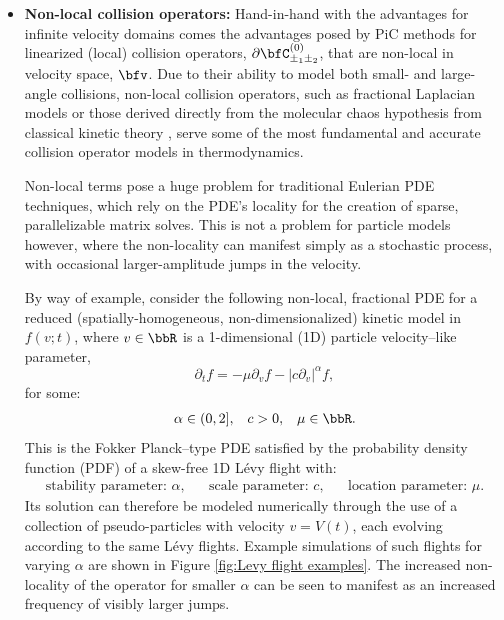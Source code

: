 \begin{itemize}
        \item  {\bf Non-local collision operators:} Hand-in-hand with the advantages for infinite velocity domains comes the advantages posed by PiC methods for linearized (local) collision operators, $\partial\bfC_{\pm_{1}\pm_{2}}^{(0)}$, that are non-local in velocity space, $\bfv$. Due to their ability to model both small- and large-angle collisions, non-local collision operators, such as fractional Laplacian models \cite{Cho_2015, Sakomoto_2016, Kiselev_Schmalian_2019} or those derived directly from the molecular chaos hypothesis from classical kinetic theory \cite{Lerner_Trigg_1991}, serve some of the most fundamental and accurate collision operator models in thermodynamics.
        
        Non-local terms pose a huge problem for traditional Eulerian PDE techniques, which rely on the PDE's locality for the creation of sparse, parallelizable matrix solves. This is not a problem for particle models however, where the non-locality can manifest simply as a stochastic process, with occasional larger-amplitude jumps in the velocity.

        By way of example, consider the following non-local, fractional PDE for a reduced (spatially-homogeneous, non-dimensionalized) kinetic model in $f(v; t)$, where $v  \in  \bbR$ is a 1-dimensional (1D) particle velocity--like parameter,
        \begin{equation}\label{eqn:reduced Boltzmann equation}
            \partial_{t}f  =  - \mu\partial_{v}f - |c\partial_{v}|^{\alpha}f,
        \end{equation}
        for some:
        \begin{align*}
            \alpha  \in  (0, 2],  &&
            c       >    0,       &&
            \mu     \in  \bbR.
        \end{align*}
        This is the Fokker Planck--type PDE satisfied by the probability density function (PDF) of a skew-free 1D Lévy flight \cite{Chechkin_et_al_2008} with:
        \begin{align*}
            \text{stability parameter: } \alpha,  &&
            \text{scale parameter: } c,           &&
            \text{location parameter: } \mu.
        \end{align*}
        Its solution can therefore be modeled numerically through the use of a collection of pseudo-particles with velocity $v  =  V(t)$, each evolving according to the same Lévy flights. Example simulations of such flights for varying $\alpha$ are shown in Figure \ref{fig:Levy flight examples}. The increased non-locality of the operator for smaller $\alpha$ can be seen to manifest as an increased frequency of visibly larger jumps.


\end{itemize}
